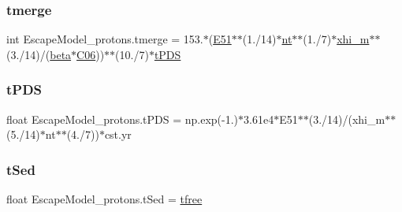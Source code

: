 \mbox{\label{namespaceEscapeModel__protons_a2a98ed31beb0bfed830980a90c9fc265}} 
\subsubsection{\texorpdfstring{tmerge}{tmerge}}
{\footnotesize\ttfamily int Escape\+Model\+\_\+protons.\+tmerge = 153.$\ast$(\hyperlink{namespaceEscapeModel__protons_af064ce6137662206b44cb8189188c577}{E51}$\ast$$\ast$(1./14)$\ast$\hyperlink{namespaceEscapeModel__protons_aea8f96db5e10e84cf033c2f0000e9642}{nt}$\ast$$\ast$(1./7)$\ast$\hyperlink{namespaceEscapeModel__protons_a268b081a857bf50124b57d6cee248852}{xhi\+\_\+m}$\ast$$\ast$(3./14)/(\hyperlink{namespaceEscapeModel__protons_aed6ba9747962e8235f612edf7305ae9f}{beta}$\ast$\hyperlink{namespaceEscapeModel__protons_a2f5b1f50d1253d9a948906d240a4260c}{C06}))$\ast$$\ast$(10./7)$\ast$\hyperlink{namespaceEscapeModel__protons_a747211c69e34b5cc134d78483bf5a6fd}{t\+P\+DS}}

\mbox{\label{namespaceEscapeModel__protons_a747211c69e34b5cc134d78483bf5a6fd}} 
\subsubsection{\texorpdfstring{t\+P\+DS}{tPDS}}
{\footnotesize\ttfamily float Escape\+Model\+\_\+protons.\+t\+P\+DS = np.\+exp(-\/1.)$\ast$3.\+61e4$\ast$\+E51$\ast$$\ast$(3./14)/(xhi\+\_\+m$\ast$$\ast$(5./14)$\ast$nt$\ast$$\ast$(4./7))$\ast$cst.\+yr}

\mbox{\label{namespaceEscapeModel__protons_a3cb247c8b443157e638764eea0a30667}} 
\subsubsection{\texorpdfstring{t\+Sed}{tSed}}
{\footnotesize\ttfamily float Escape\+Model\+\_\+protons.\+t\+Sed = \hyperlink{namespaceEscapeModel__protons_ab0de8bc17835b3b00d3ab940c83c199f}{tfree}}

